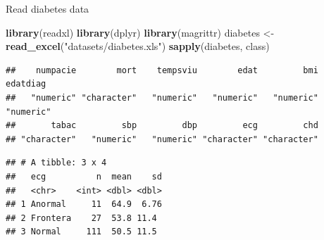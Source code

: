 \documentclass[
  ignorenonframetext,
]{beamer}
\newenvironment{Shaded}{\begin{snugshade}}{\end{snugshade}}
\newcommand{\DataTypeTok}[1]{\textcolor[rgb]{0.13,0.29,0.53}{#1}}
\newcommand{\KeywordTok}[1]{\textcolor[rgb]{0.13,0.29,0.53}{\textbf{#1}}}
\newcommand{\NormalTok}[1]{#1}
\newcommand{\OperatorTok}[1]{\textcolor[rgb]{0.81,0.36,0.00}{\textbf{#1}}}
\newcommand{\StringTok}[1]{\textcolor[rgb]{0.31,0.60,0.02}{#1}}
\begin{document}
\begin{frame}[fragile]{Read diabetes data}
\protect\hypertarget{read-diabetes-data}{}

\tiny

\begin{Shaded}
\begin{Highlighting}[]
\KeywordTok{library}\NormalTok{(readxl)}
\KeywordTok{library}\NormalTok{(dplyr)}
\KeywordTok{library}\NormalTok{(magrittr)}
\NormalTok{diabetes <-}\StringTok{ }\KeywordTok{read_excel}\NormalTok{(}\StringTok{"datasets/diabetes.xls"}\NormalTok{)}
\KeywordTok{sapply}\NormalTok{(diabetes, class)}
\end{Highlighting}
\end{Shaded}

\begin{verbatim}
##    numpacie        mort    tempsviu        edat         bmi    edatdiag 
##   "numeric" "character"   "numeric"   "numeric"   "numeric"   "numeric" 
##       tabac         sbp         dbp         ecg         chd 
## "character"   "numeric"   "numeric" "character" "character"
\end{verbatim}

\begin{Shaded}
\end{Shaded}

\begin{verbatim}
## # A tibble: 3 x 4
##   ecg          n  mean    sd
##   <chr>    <int> <dbl> <dbl>
## 1 Anormal     11  64.9  6.76
## 2 Frontera    27  53.8 11.4 
## 3 Normal     111  50.5 11.5
\end{verbatim}

\end{frame}
\end{document}
